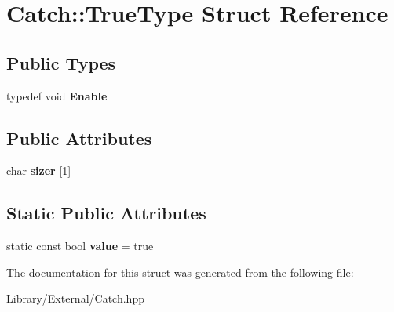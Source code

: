 \hypertarget{struct_catch_1_1_true_type}{}\section{Catch\+:\+:True\+Type Struct Reference}
\label{struct_catch_1_1_true_type}
\subsection*{Public Types}
\begin{DoxyCompactItemize}
\item 
\hypertarget{struct_catch_1_1_true_type_a1c370b2ef39036c053357b868ef94a97}{}typedef void {\bfseries Enable}\label{struct_catch_1_1_true_type_a1c370b2ef39036c053357b868ef94a97}

\end{DoxyCompactItemize}
\subsection*{Public Attributes}
\begin{DoxyCompactItemize}
\item 
\hypertarget{struct_catch_1_1_true_type_a8a7ed3be2e763d614e7d1f0cd18219d1}{}char {\bfseries sizer} \mbox{[}1\mbox{]}\label{struct_catch_1_1_true_type_a8a7ed3be2e763d614e7d1f0cd18219d1}

\end{DoxyCompactItemize}
\subsection*{Static Public Attributes}
\begin{DoxyCompactItemize}
\item 
\hypertarget{struct_catch_1_1_true_type_ac7b4114d6c6d3d4ff8d2df67f243d2be}{}static const bool {\bfseries value} = true\label{struct_catch_1_1_true_type_ac7b4114d6c6d3d4ff8d2df67f243d2be}

\end{DoxyCompactItemize}


The documentation for this struct was generated from the following file\+:\begin{DoxyCompactItemize}
\item 
Library/\+External/Catch.\+hpp\end{DoxyCompactItemize}

